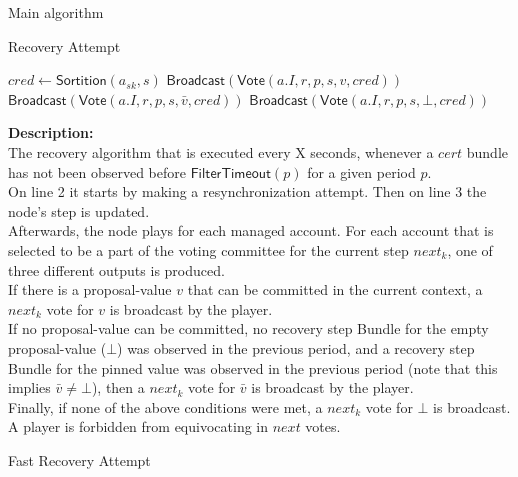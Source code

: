 \documentclass[10pt,a4paper]{article}
\begin{document}
\begin{section}{Main algorithm}
\begin{subsection}{Recovery Attempt}
\begin{algorithm}[H]
\begin{algorithmic}[1]
            \State $cred \gets 
            \mathsf{\mathsf{Sortition}}(a_{sk}, s)$
                    \State $\mathsf{Broadcast}(\mathsf{Vote}(a.I, r, p, s, v, cred))$
                    \State $\mathsf{Broadcast}(\mathsf{Vote}(a.I, r, p, s, \bar{v}, cred))$
                \Else
                    \State $\mathsf{Broadcast}(\mathsf{Vote}(a.I, r, p, s, \bot, cred))$
                \EndIf
            \EndIf
        \EndFor
        \EndFunction
        \end{algorithmic}
    \end{algorithm}
    
    
    \noindent \textbf{Description:}\\
The recovery algorithm that is executed every X seconds, 
whenever a $cert$ bundle has not been observed before $\mathsf{FilterTimeout}(p)$ for a given period $p$. \\
On line 2 it starts by making a resynchronization attempt. Then on line 3 the node's step is updated.\\
Afterwards, the node plays for each managed account. For each account that is selected to be a part of the voting committee for the current
step $next_k$, one of three different outputs is produced. \\
If there is a proposal-value $v$ that can be committed in the current context, a $next_k$ vote for $v$ is broadcast by the player. \\
If no proposal-value can be committed, no recovery step Bundle for the empty proposal-value ($\bot$) was observed in the 
previous period, and a recovery step Bundle for the pinned value was observed in the previous period (note that this implies $\bar{v} \neq \bot$),
then a $next_k$ vote for $\bar{v}$ is broadcast by the player. \\
Finally, if none of the above conditions were met, a $next_k$ vote for $\bot$ is broadcast. A player is forbidden
from equivocating in $next$ votes.

\end{subsection}


\begin{subsection}{Fast Recovery Attempt}\label{ssect:FastRecovery}


\end{subsection}
\end{section}
\end{document}
